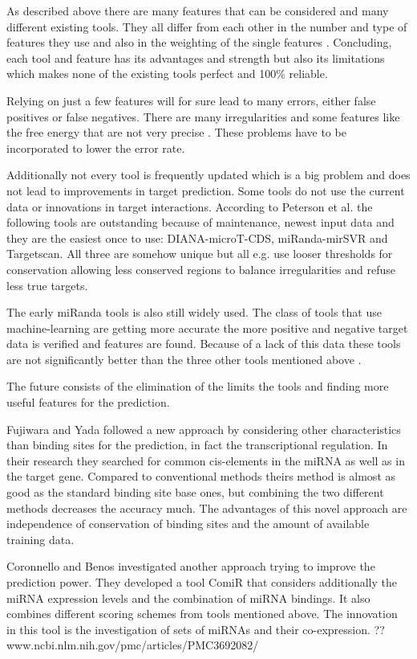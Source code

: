 \documentclass[12pt]{article}
\begin{document}
As described above there are many features that can be considered and many different existing tools. They all differ from each other in the number and type of features they use and also in the weighting of the single features \cite{Peterson}. Concluding, each tool and feature has its advantages and strength but also its limitations which makes none of the existing tools perfect and 100\% reliable. 

Relying on just a few features will for sure lead to many errors, either false positives or false negatives. There are many irregularities and some features like the free energy that are not very precise \cite{Peterson}. These problems have to be incorporated to lower the error rate.

Additionally not every tool is frequently updated which is a big problem and does not lead to improvements in target prediction. Some tools do not use the current data or innovations in target interactions. According to Peterson et al. \cite{Peterson} the following tools are outstanding because of maintenance, newest input data and they are the easiest once to use: DIANA-microT-CDS, miRanda-mirSVR and Targetscan. All three are somehow unique but all e.g. use looser thresholds for conservation allowing less conserved regions to balance irregularities and refuse less true targets.

The early miRanda tools is also still widely used. The class of tools that use machine-learning are getting more accurate the more positive and negative target data is verified and features are found. Because of a lack of this data these tools are not significantly better than the three other tools mentioned above \cite{Peterson}.

The future consists of the elimination of the limits the tools and finding more useful features for the prediction.

Fujiwara and Yada \cite{Fuji} followed a new approach by considering other characteristics than binding sites for the prediction, in fact the transcriptional regulation. In their research they searched for common cis-elements in the miRNA as well as in the target gene. Compared to conventional methods theirs method is almost as good as the standard binding site base ones, but combining the two different methods decreases the accuracy much. The advantages of this novel approach are independence of conservation of binding sites and the amount of available training data. 

Coronnello and Benos \cite{Coronnello} investigated another approach trying to improve the prediction power. They developed a tool ComiR that considers additionally the miRNA expression levels and the combination of miRNA bindings. It also combines different scoring schemes from tools mentioned above. The innovation in this tool is the investigation of sets of miRNAs and their co-expression. ?? www.ncbi.nlm.nih.gov/pmc/articles/PMC3692082/
\end{document}
